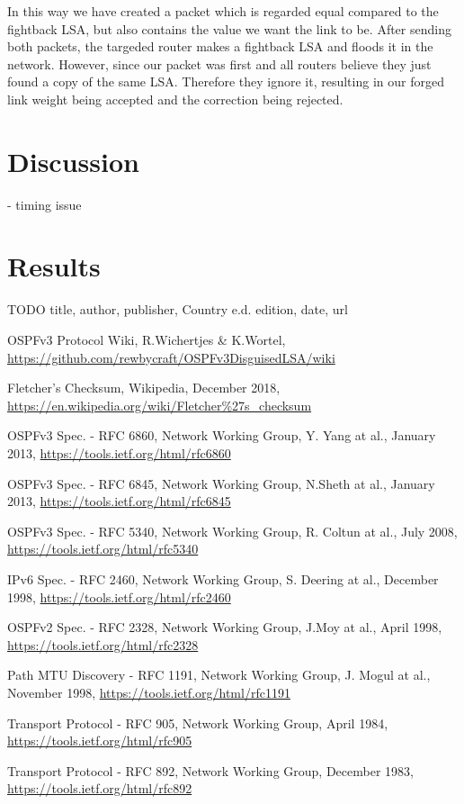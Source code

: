 \documentclass[11pt,a4paper,oneside]{article}
\newcommand{\lsection}[2]{\section{#1}\label{sec:#2}}
\begin{document}
    				In this way we have created a packet which is regarded equal compared to the fightback LSA, but also contains the value we want the link to be. After sending both packets, the targeded router makes a fightback LSA and floods it in the network. However, since our packet was first and all routers believe they just found a copy of the same LSA. Therefore they ignore it, resulting in our forged link weight being accepted and the correction being rejected.
    				
    \lsection{Discussion}{discussion}
    		- timing issue
    		
    		
    \lsection{Results}{results}
    		
    
    
    \begin{thebibliography}{999}
TODO
title,
author,
publisher,
Country e.d.
edition,
date,
url

OSPFv3 Protocol Wiki,
R.Wichertjes \& K.Wortel,
\url{https://github.com/rewbycraft/OSPFv3DisguisedLSA/wiki}

Fletcher's Checksum,
Wikipedia,
December 2018,
\url{https://en.wikipedia.org/wiki/Fletcher\%27s_checksum}


OSPFv3 Spec. - RFC 6860,
Network Working Group,
Y. Yang at al.,
January 2013,
\url{https://tools.ietf.org/html/rfc6860}

OSPFv3 Spec. - RFC 6845,
Network Working Group,
N.Sheth at al.,
January 2013,
\url{https://tools.ietf.org/html/rfc6845}

OSPFv3 Spec. - RFC 5340,
Network Working Group,
R. Coltun at al.,
July 2008,
\url{https://tools.ietf.org/html/rfc5340}

IPv6 Spec. - RFC 2460,
Network Working Group,
S. Deering at al.,
December 1998,
\url{https://tools.ietf.org/html/rfc2460}

OSPFv2 Spec. - RFC 2328,
Network Working Group,
J.Moy at al.,
April 1998,
\url{https://tools.ietf.org/html/rfc2328}

Path MTU Discovery - RFC 1191,
Network Working Group,
J. Mogul at al.,
November 1998,
\url{https://tools.ietf.org/html/rfc1191}

Transport Protocol - RFC 905,
Network Working Group,
April 1984,
\url{https://tools.ietf.org/html/rfc905}

Transport Protocol - RFC 892,
Network Working Group,
December 1983,
\url{https://tools.ietf.org/html/rfc892}

    \end{thebibliography}
\end{document}
